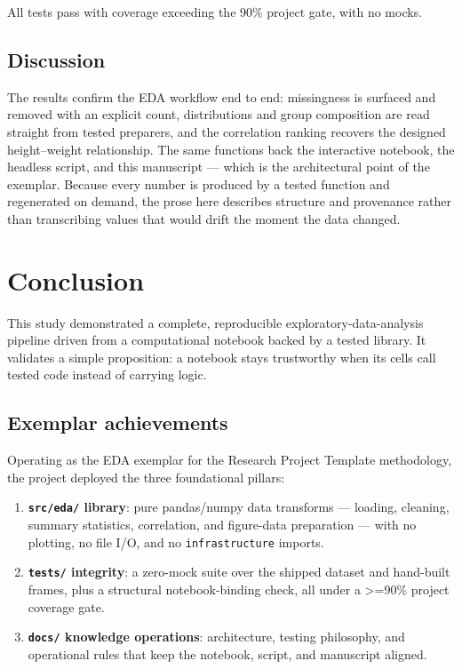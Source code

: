 \documentclass[
  english,
]{article}
\providecommand{\tightlist}{%
  \setlength{\itemsep}{0pt}\setlength{\parskip}{0pt}}
\begin{document}
All tests pass with coverage exceeding the 90\% project gate, with no
mocks.

\subsection{Discussion}\label{discussion}

The results confirm the EDA workflow end to end: missingness is surfaced
and removed with an explicit count, distributions and group composition
are read straight from tested preparers, and the correlation ranking
recovers the designed height--weight relationship. The same functions
back the interactive notebook, the headless script, and this manuscript
--- which is the architectural point of the exemplar. Because every
number is produced by a tested function and regenerated on demand, the
prose here describes structure and provenance rather than transcribing
values that would drift the moment the data changed.

\newpage

\section{Conclusion}\label{sec:conclusion}

This study demonstrated a complete, reproducible
exploratory-data-analysis pipeline driven from a computational notebook
backed by a tested library. It validates a simple proposition: a
notebook stays trustworthy when its cells call tested code instead of
carrying logic.

\subsection{Exemplar achievements}\label{exemplar-achievements}

Operating as the EDA exemplar for the Research Project Template
methodology, the project deployed the three foundational pillars:

\begin{enumerate}
\def\labelenumi{\arabic{enumi}.}
\tightlist
\item
  \textbf{\texttt{src/eda/} library}: pure pandas/numpy data transforms
  --- loading, cleaning, summary statistics, correlation, and
  figure-data preparation --- with no plotting, no file I/O, and no
  \texttt{infrastructure} imports.
\item
  \textbf{\texttt{tests/} integrity}: a zero-mock suite over the shipped
  dataset and hand-built frames, plus a structural notebook-binding
  check, all under a \texorpdfstring{\textgreater{}=}{>=}90\% project coverage gate.
\item
  \textbf{\texttt{docs/} knowledge operations}: architecture, testing
  philosophy, and operational rules that keep the notebook, script, and
  manuscript aligned.
\end{enumerate}
\end{document}
